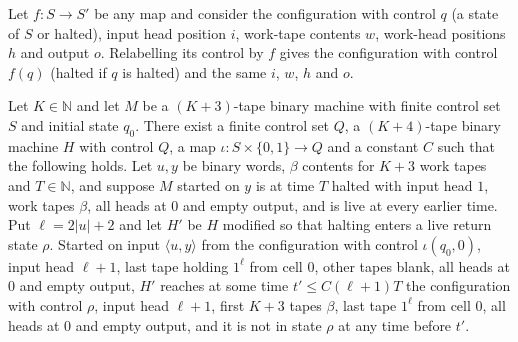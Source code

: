 \begin{theorem}
\label{Complexity.f6_mapState_mk}
\leanok
{}
Let $f:S\to S'$ be any map and consider the configuration with control $q$ (a state of $S$ or
halted), input head position $i$, work-tape contents $w$, work-head positions $h$ and output $o$.
Relabelling its control by $f$ gives the configuration with control $f(q)$ (halted if $q$ is
halted) and the same $i$, $w$, $h$ and $o$.
\end{theorem}

\begin{theorem}
\label{Complexity.f6_hosted}
\leanok
{}
Let $K\in\mathbb{N}$ and let $M$ be a $(K+3)$-tape binary machine with finite control set $S$ and
initial state $q_0$. There exist a finite control set $Q$, a $(K+4)$-tape binary machine $H$ with
control $Q$, a map $\iota:S\times\{0,1\}\to Q$ and a constant $C$ such that the following holds.
Let $u,y$ be binary words, $\beta$ contents for $K+3$ work tapes and $T\in\mathbb{N}$, and suppose
$M$ started on $y$ is at time $T$ halted with input head $1$, work tapes $\beta$, all heads at $0$
and empty output, and is live at every earlier time. Put $\ell=2|u|+2$ and let $H'$ be $H$ modified
so that halting enters a live return state $\rho$. Started on input $\langle u,y\rangle$ from the
configuration with control $\iota(q_0,0)$, input head $\ell+1$, last tape holding $1^\ell$ from
cell $0$, other tapes blank, all heads at $0$ and empty output, $H'$ reaches at some time
$t'\le C(\ell+1)T$ the configuration with control $\rho$, input head $\ell+1$, first $K+3$ tapes
$\beta$, last tape $1^\ell$ from cell $0$, all heads at $0$ and empty output, and it is not in
state $\rho$ at any time before $t'$.
\end{theorem}

